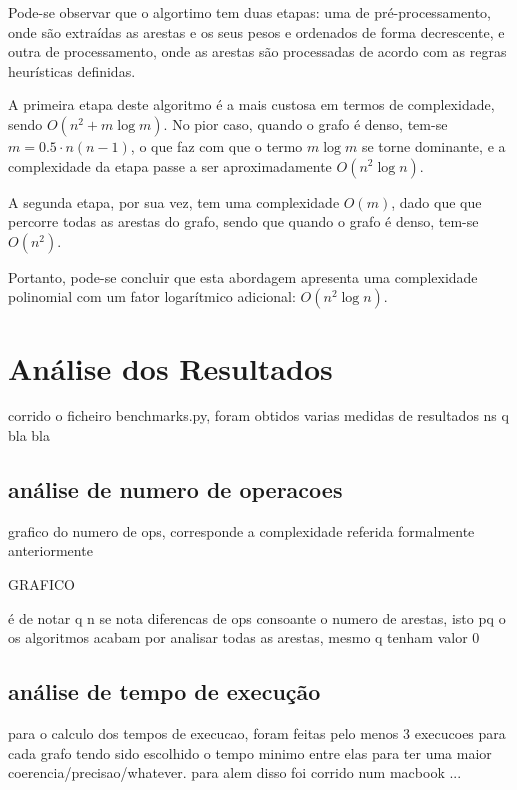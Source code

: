 \documentclass[mirror]{revdetua}
\begin{document}

Pode-se observar que o algortimo tem duas etapas: uma de pré-processamento, onde são extraídas as arestas e os seus pesos e ordenados de forma decrescente, e outra de processamento, onde as arestas são processadas de acordo com as regras heurísticas definidas.

A primeira etapa deste algoritmo é a mais custosa em termos de complexidade, sendo $O(n^2 + m \log m)$. No pior caso, quando o grafo é denso, tem-se $m = 0.5 \cdot n(n-1)$, o que faz com que o termo $m \log m$ se torne dominante, e a complexidade da etapa passe a ser aproximadamente $O(n^2 \log n)$.

A segunda etapa, por sua vez, tem uma complexidade $O(m)$, dado que que percorre todas as arestas do grafo, sendo que quando o grafo é denso, tem-se $O(n^2)$.

Portanto, pode-se concluir que esta abordagem apresenta uma complexidade polinomial com um fator logarítmico adicional: $O(n^2 \log n)$.

\section{Análise dos Resultados}

corrido o ficheiro benchmarks.py, foram obtidos varias medidas de resultados ns q bla bla

\subsection{análise de numero de operacoes}

grafico do numero de ops, corresponde a complexidade referida formalmente anteriormente

GRAFICO

é de notar q n se nota diferencas de ops consoante o numero de arestas, isto pq o os algoritmos acabam por analisar todas as arestas, mesmo q tenham valor 0

\subsection{análise de tempo de execução}

para o calculo dos tempos de execucao, foram feitas pelo menos 3 execucoes para cada grafo tendo sido escolhido o tempo minimo entre elas para ter uma maior coerencia/precisao/whatever. para alem disso foi corrido num macbook ...
\end{document}
